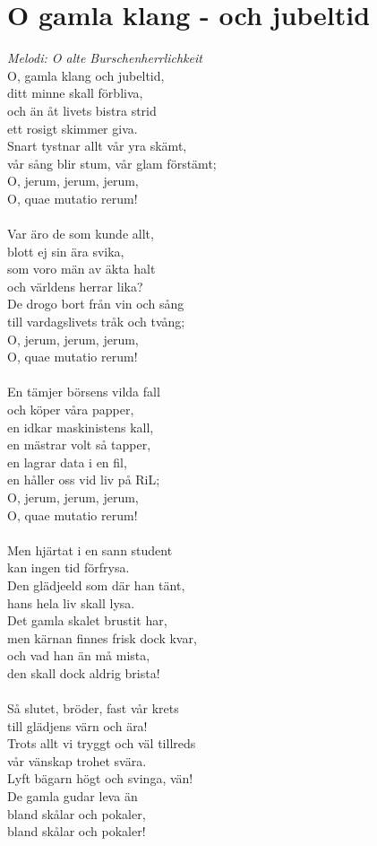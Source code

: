 \section{O gamla klang - och jubeltid}
\textit{Melodi: O alte Burschenherrlichkeit}
\vspace{2mm}\\
O, gamla klang och jubeltid,\\
ditt minne skall förbliva,\\
och än åt livets bistra strid\\
ett rosigt skimmer giva.\\
Snart tystnar allt vår yra skämt,\\
vår sång blir stum, vår glam förstämt;\\
O, jerum, jerum, jerum,\\
O, quae mutatio rerum!\\
\\
Var äro de som kunde allt,\\
blott ej sin ära svika,\\
som voro män av äkta halt\\
och världens herrar lika?\\
De drogo bort från vin och sång\\
till vardagslivets tråk och tvång;\\
O, jerum, jerum, jerum,\\
O, quae mutatio rerum!\\
\\
En tämjer börsens vilda fall\\
och köper våra papper,\\
en idkar maskinistens kall,\\
en mästrar volt så tapper,\\
en lagrar data i en fil,\\
en håller oss vid liv på RiL;\\
O, jerum, jerum, jerum,\\
O, quae mutatio rerum!\\
\\
Men hjärtat i en sann student\\
kan ingen tid förfrysa.\\
Den glädjeeld som där han tänt,\\
hans hela liv skall lysa.\\
Det gamla skalet brustit har,\\
men kärnan finnes frisk dock kvar,\\
och vad han än må mista,\\
den skall dock aldrig brista!\\
\\
Så slutet, bröder, fast vår krets\\
till glädjens värn och ära!\\
Trots allt vi tryggt och väl tillreds\\
vår vänskap trohet svära.\\
Lyft bägarn högt och svinga, vän!\\
De gamla gudar leva än\\
bland skålar och pokaler,\\
bland skålar och pokaler!\\
